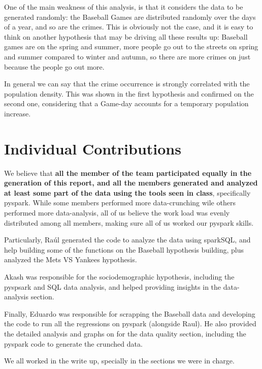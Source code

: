 \documentclass{article}
\begin{document}
One of the main weakness of this analysis, is that it considers the data to be generated randomly: the Baseball Games are distributed randomly over the days of a year, and so are the crimes. This is obviously not the case, and it is easy to think on another hypothesis that may be driving all these results up: Baseball games are on the spring and summer, more people go out to the streets on spring and summer compared to winter and autumn, so there are more crimes on just because the people go out more. 

In general we can say that the crime  occurrence is strongly correlated with the population density. This was shown in the first hypothesis and confirmed on the second one, considering that a Game-day accounts for a temporary population increase. 

\pagebreak
\section{Individual Contributions}

We believe that \textbf{all the member of the team participated equally in the generation of this report, and all the members generated and analyzed at least some part of the data using the tools seen in class}, specifically pyspark. While some members performed more data-crunching wile others performed more data-analysis, all of us believe the work load was evenly distributed among all members, making sure all of us worked our pyspark skills. 

Particularly, Raúl generated the code to analyze the data using sparkSQL, and help building some of the functions on the Baseball hypothesis building, plus analyzed the Mets VS Yankees hypothesis. 

Akash was responsible for the sociodemographic hypothesis, including the pyspsark and SQL data analysis, and helped providing insights in the data-analysis section.

Finally, Eduardo was responsible for scrapping the Baseball data and developing the code to run all the regressions on pyspark (alongside Raul). He also provided the detailed analysis and graphs on for the data quality section, including the pyspark code to generate the crunched data.  

We all worked in the write up, specially in the sections we were in charge.

\newpage
\printbibliography 
\end{document}
